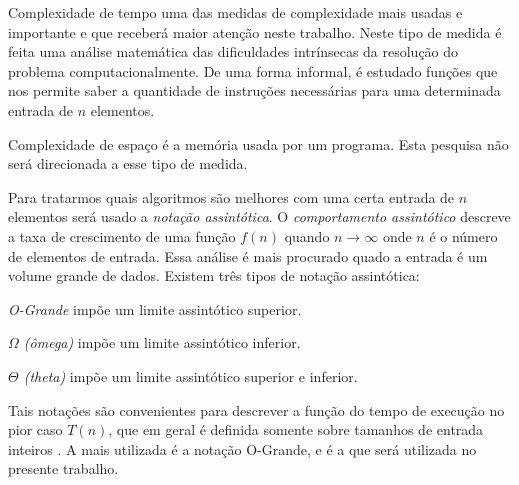 Complexidade de tempo uma das medidas de complexidade mais usadas e importante \cite{toscani} e que receberá maior
atenção neste trabalho. Neste tipo de medida é feita uma análise matemática das dificuldades intrínsecas da resolução do 
problema computacionalmente. De uma forma informal, é estudado funções que nos permite saber a quantidade de instruções necessárias
para uma determinada entrada de $n$ elementos.

Complexidade de espaço é a memória usada por um programa. Esta pesquisa não será direcionada a esse tipo de medida. 

Para tratarmos quais algoritmos são melhores com uma certa entrada de $n$ elementos
será usado a \emph{notação assintótica}. O \emph{comportamento assintótico} descreve a taxa de crescimento de uma função
$f(n)$ quando $n \rightarrow \infty$ onde $n$ é o número de elementos de entrada. Essa análise é mais procurado quado a entrada é um volume grande
de dados.
Existem três tipos de notação assintótica:

\emph{O-Grande} impõe um limite assintótico superior.

\emph{$\Omega$ (ômega)} impõe um limite assintótico inferior.

\emph{$\Theta$ (theta)} impõe um limite assintótico superior e inferior.

Tais notações são convenientes para descrever a função do tempo de execução no
pior caso $T(n)$, que em geral é definida somente sobre tamanhos de entrada inteiros \cite{cormen}.
A mais utilizada é a notação O-Grande, e é a que será utilizada no presente trabalho.
